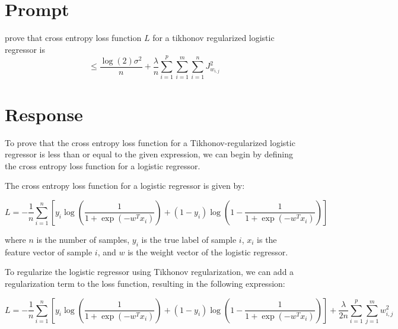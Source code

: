 \documentclass[conference]{IEEEtran}
\date{September 2022}
\begin{document}
\section{Prompt}
prove that cross entropy loss  function $L$ for a tikhonov regularized logistic regressor is 
$$
\leq \frac{ \log(2) \sigma^2}{n} + \frac{\lambda}{n} \sum_{i=1}^p \sum_{i=1}^m \sum_{i=1}^n J^2_{w_{i,j}} 

$$

\section{Response}
To prove that the cross entropy loss function for a Tikhonov-regularized logistic regressor is less than or equal to the given expression, we can begin by defining the cross entropy loss function for a logistic regressor.

The cross entropy loss function for a logistic regressor is given by:

$$L = -\frac{1}{n} \sum_{i=1}^n \left[ y_i \log \left( \frac{1}{1 + \exp(-w^T x_i)} \right) + (1 - y_i) \log \left( 1 - \frac{1}{1 + \exp(-w^T x_i)} \right) \right]$$

where $n$ is the number of samples, $y_i$ is the true label of sample $i$, $x_i$ is the feature vector of sample $i$, and $w$ is the weight vector of the logistic regressor.

To regularize the logistic regressor using Tikhonov regularization, we can add a regularization term to the loss function, resulting in the following expression:

$$L = -\frac{1}{n} \sum_{i=1}^n \left[ y_i \log \left( \frac{1}{1 + \exp(-w^T x_i)} \right) + (1 - y_i) \log \left( 1 - \frac{1} {1 + \exp(-w^T x_i)} \right) \right] + \frac{\lambda}{2n} \sum_{i=1}^p \sum_{j=1}^m w_{i,j}^2$$
\end{document}

